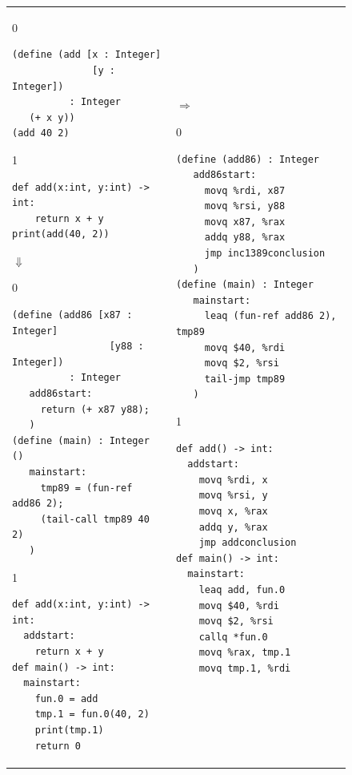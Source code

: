 \documentclass[7x10]{TimesAPriori_MIT}%
\def\racketEd{0}
\def\pythonEd{1}
\def\edition{1}
\newcommand{\pythonColor}[0]{}
\numberwithin{theorem}{chapter}
\numberwithin{definition}{chapter}
\numberwithin{equation}{chapter}
\begin{document}
\begin{figure}[hbtp]
  \begin{tcolorbox}[colback=white]
    \begin{tabular}{ll}
\begin{minipage}{0.4\textwidth}
{\if\edition\racketEd
\begin{lstlisting}[basicstyle=\ttfamily\footnotesize]
(define (add [x : Integer]
              [y : Integer])
          : Integer
   (+ x y))
(add 40 2)
\end{lstlisting}
\fi}
{\if\edition\pythonEd\pythonColor
\begin{lstlisting}[basicstyle=\ttfamily\footnotesize]
def add(x:int, y:int) -> int:
    return x + y
print(add(40, 2))
\end{lstlisting}
\fi}
$\Downarrow$
{\if\edition\racketEd
\begin{lstlisting}[basicstyle=\ttfamily\footnotesize]
(define (add86 [x87 : Integer]
                 [y88 : Integer])
          : Integer
   add86start:
     return (+ x87 y88);
   )
(define (main) : Integer ()
   mainstart:
     tmp89 = (fun-ref add86 2);
     (tail-call tmp89 40 2)
   )
\end{lstlisting}
\fi}
{\if\edition\pythonEd\pythonColor
\begin{lstlisting}[basicstyle=\ttfamily\footnotesize]
def add(x:int, y:int) -> int:
  addstart:
    return x + y
def main() -> int:
  mainstart:
    fun.0 = add
    tmp.1 = fun.0(40, 2)
    print(tmp.1)
    return 0
\end{lstlisting}
\fi}
\end{minipage}
&
$\Rightarrow$
\begin{minipage}{0.5\textwidth}
{\if\edition\racketEd
\begin{lstlisting}[basicstyle=\ttfamily\footnotesize]
(define (add86) : Integer
   add86start:
     movq %rdi, x87
     movq %rsi, y88
     movq x87, %rax
     addq y88, %rax
     jmp inc1389conclusion
   )
(define (main) : Integer
   mainstart:
     leaq (fun-ref add86 2), tmp89
     movq $40, %rdi
     movq $2, %rsi
     tail-jmp tmp89
   )
\end{lstlisting}
\fi}
{\if\edition\pythonEd\pythonColor
\begin{lstlisting}[basicstyle=\ttfamily\footnotesize]
def add() -> int:
  addstart:
    movq %rdi, x
    movq %rsi, y
    movq x, %rax
    addq y, %rax
    jmp addconclusion
def main() -> int:
  mainstart:
    leaq add, fun.0
    movq $40, %rdi
    movq $2, %rsi
    callq *fun.0
    movq %rax, tmp.1
    movq tmp.1, %rdi

\end{lstlisting}}
\end{minipage}
\end{tabular}
\end{tcolorbox}
\end{figure}
\end{document}
